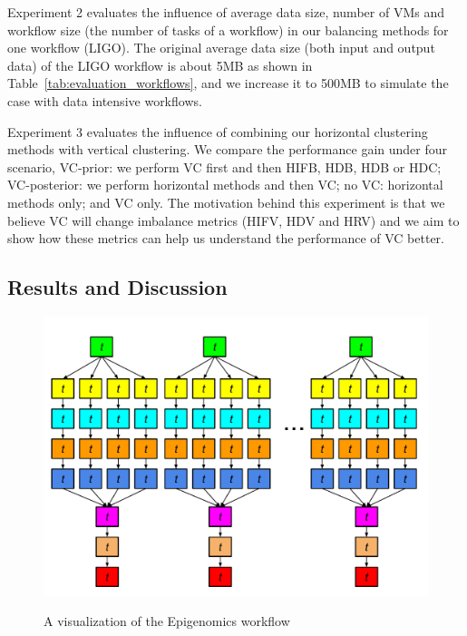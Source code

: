 Experiment 2 evaluates the influence of average data size, number of VMs and workflow size (the number of tasks of a workflow) in our balancing methods for one workflow (LIGO). 
The original average data size (both input and output data) of the LIGO workflow is about 5MB as shown in Table~\ref{tab:evaluation_workflows}, and we increase it to 500MB to simulate the case with data intensive workflows. 

Experiment 3 evaluates the influence of combining our horizontal clustering methods with vertical clustering. We compare the performance gain under four scenario, VC-prior: we perform VC first and then HIFB, HDB, HDB or HDC; VC-posterior: we perform horizontal methods and then VC; no VC: horizontal methods only; and VC only. The motivation behind this experiment is that we believe VC will change imbalance metrics (HIFV, HDV and HRV) and we aim to show how these metrics can help us understand the performance of VC better. 

\subsection{Results and Discussion}
\begin{figure}[htb]
	\centering
	\includegraphics[width=0.8\linewidth]{figures/evaluation/big_genome.pdf} \\
	\caption{A visualization of the Epigenomics workflow}
	\label{fig:evaluation_shape_big_genome}
\end{figure}

